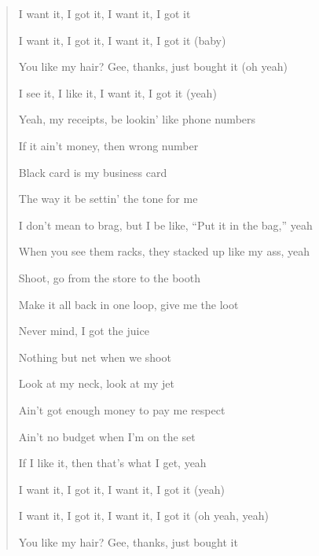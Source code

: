 \documentclass{article}
\begin{document}
\begin{enumerate}
\begin{quotation}
		I want it, I got it, I want it, I got it
		
		I want it, I got it, I want it, I got it (baby)
		
		You like my hair? Gee, thanks, just bought it (oh yeah)
		
		I see it, I like it, I want it, I got it (yeah)
		
		Yeah, my receipts, be lookin' like phone numbers
		
		If it ain't money, then wrong number
		
		Black card is my business card
		
		The way it be settin' the tone for me
		
		I don't mean to brag, but I be like, ``Put it in the bag,'' yeah
		
		When you see them racks, they stacked up like my ass, yeah
		
		Shoot, go from the store to the booth
		
		Make it all back in one loop, give me the loot
		
		Never mind, I got the juice
		
		Nothing but net when we shoot
		
		Look at my neck, look at my jet
		
		Ain't got enough money to pay me respect
		
		Ain't no budget when I'm on the set
		
		If I like it, then that's what I get, yeah
		
		I want it, I got it, I want it, I got it (yeah)
		
		I want it, I got it, I want it, I got it (oh yeah, yeah)
		
		You like my hair? Gee, thanks, just bought it
		

\end{quotation}
\end{enumerate}
\end{document}
